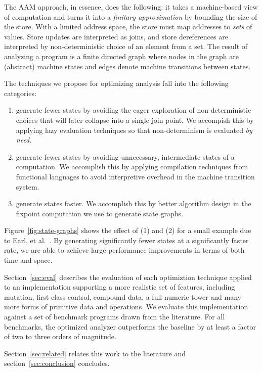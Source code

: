 \documentclass[preprint,onecolumn,9pt]{sigplanconf} %
\begin{document}
The AAM approach, in essence, does the following: it takes a
machine-based view of computation and turns it into a \emph{finitary
  approximation} by bounding the size of the store.  With a limited
address space, the store must map addresses to \emph{sets} of values.
Store updates are interpreted as joins, and store dereferences are
interpreted by non-deterministic choice of an element from a set.  The
result of analyzing a program is a finite directed graph where nodes
in the graph are (abstract) machine states and edges denote machine
transitions between states.

The techniques we propose for optimizing analysis fall into the
following categories:
\begin{enumerate}
\item generate fewer states by avoiding the eager exploration of
  non-deterministic choices that will later collapse into a single
  join point.  We accompish this by applying lazy evaluation
  techniques so that non-determinism is evaluated \emph{by need}.

\item generate fewer states by avoiding unnecessary, intermediate
  states of a computation.  We accomplish this by applying compilation
  techniques from functional languages to avoid interpretive overhead
  in the machine transition system.

\item generate states faster.  We accomplish this by better algorithm
  design in the fixpoint computation we use to generate state graphs.
\end{enumerate}
Figure~\ref{fig:state-graphs} shows the effect of (1) and (2) for a
small example due to Earl, et
al.~\cite{dvanhorn:Earl2012Introspective}.
By generating significantly fewer states at a significantly faster
rate, we are able to achieve large performance improvements in terms
of both time and space.

Section~\ref{sec:eval} describes the evaluation of each optimiztion
technique applied to an implementation supporting a more realistic set
of features, including mutation, first-class control, compound data, a
full numeric tower and many more forms of primitive data and
operations.
%
We evaluate this implementation against a set of benchmark programs
drawn from the literature.
%
For all benchmarks, the optimized analyzer outperforms the baseline
by at least a factor of
two to
three orders of magnitude.

Section~\ref{sec:related} relates this work to the literature and
section~\ref{sec:conclusion} concludes.
\end{document}

